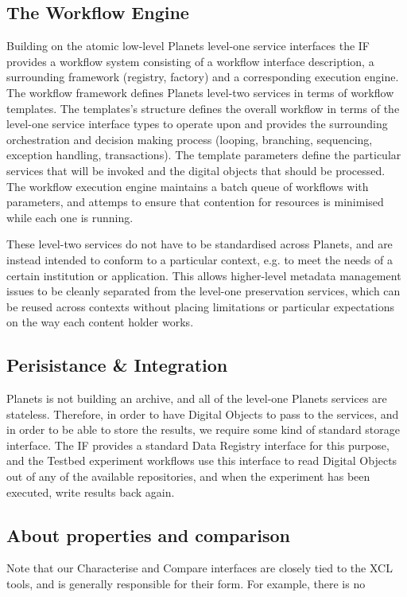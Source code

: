 \documentclass{article}
\begin{document}
\subsection{The Workflow Engine}
\label{ss-wee}
Building on the atomic low-level Planets level-one service interfaces the IF
provides a workflow system consisting of a workflow interface description, a
surrounding framework (registry, factory) and a corresponding execution engine.
The workflow framework defines Planets level-two services in terms of workflow
templates. The templates's structure defines the overall workflow in terms of the
level-one service interface types to operate upon and provides the surrounding
orchestration and decision making process (looping, branching, sequencing,
exception handling, transactions).  The template parameters define the particular
services that will be invoked and the digital objects that should be processed.
The workflow execution engine maintains a batch queue of workflows with
parameters, and attemps to ensure that contention for resources is minimised
while each one is running.

These level-two services do not have to be standardised across Planets, and are
instead intended to conform to a particular context, e.g. to meet the needs of a
certain institution or application. This allows higher-level metadata management
issues to be cleanly separated from the level-one preservation services, which
can be reused across contexts without placing limitations or particular
expectations on the way each content holder works.

\subsection{Perisistance \& Integration}
Planets is not building an archive, and all of the level-one Planets services are
stateless.  Therefore, in order to have Digital Objects to pass to the services,
and in order to be able to store the results, we require some kind of standard
storage interface. The IF provides a standard Data Registry interface for this
purpose, and the Testbed experiment workflows use this interface to read Digital
Objects out of any of the available repositories, and when the experiment has
been executed, write results back again.


\subsection{About properties and comparison}
Note that our Characterise and Compare interfaces are closely tied to the XCL
tools, and is generally responsible for their form.  For example, there is no
\end{document}
